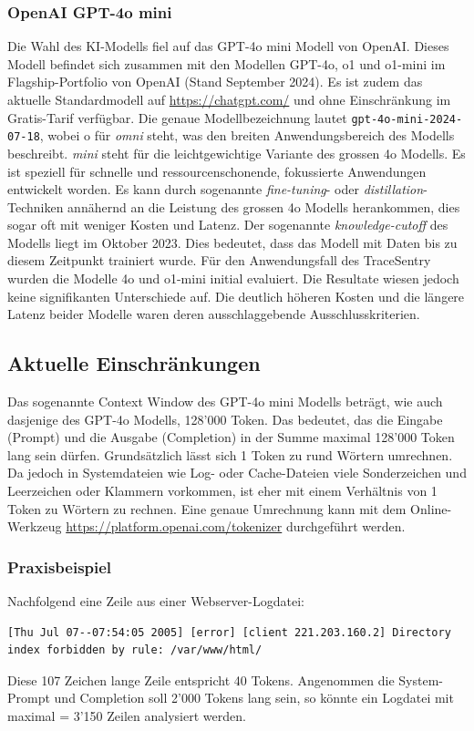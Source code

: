 \documentclass[a4paper,12pt]{report}
\begin{document}
    \subsubsection{OpenAI GPT-4o mini}\label{subsubsec:openai-gpt-4o}
    Die Wahl des KI-Modells fiel auf das GPT-4o mini Modell von OpenAI\@.
    Dieses Modell befindet sich zusammen mit den Modellen GPT-4o, o1 und o1-mini im Flagship-Portfolio von OpenAI (Stand September 2024).
    Es ist zudem das aktuelle Standardmodell auf \url{https://chatgpt.com/} und ohne Einschränkung im Gratis-Tarif verfügbar.
    Die genaue Modellbezeichnung lautet \texttt{gpt-4o-mini-2024-07-18}, wobei o für \textit{omni} steht, was den breiten Anwendungsbereich des Modells beschreibt.
    \textit{mini} steht für die leichtgewichtige Variante des grossen 4o Modells.
    Es ist speziell für schnelle und ressourcenschonende, fokussierte Anwendungen entwickelt worden.
    Es kann durch sogenannte \textit{fine-tuning}- oder \textit{distillation}-Techniken annähernd an die Leistung des grossen 4o Modells herankommen, dies sogar oft mit weniger Kosten und Latenz.
    Der sogenannte \textit{knowledge-cutoff} des Modells liegt im Oktober 2023.
    Dies bedeutet, dass das Modell mit Daten bis zu diesem Zeitpunkt trainiert wurde.
    Für den Anwendungsfall des TraceSentry wurden die Modelle 4o und o1-mini initial evaluiert.
    Die Resultate wiesen jedoch keine signifikanten Unterschiede auf.
    Die deutlich höheren Kosten und die längere Latenz beider Modelle waren deren ausschlaggebende Ausschlusskriterien.

    \subsection{Aktuelle Einschränkungen}\label{subsec:technische-einschrankungen}
    Das sogenannte Context Window des GPT-4o mini Modells beträgt, wie auch dasjenige des GPT-4o Modells, 128'000 Token.
    Das bedeutet, das die Eingabe (Prompt) und die Ausgabe (Completion) in der Summe maximal 128'000 Token lang sein dürfen.
    Grundsätzlich lässt sich 1 Token zu rund  Wörtern umrechnen.
    Da jedoch in Systemdateien wie Log- oder Cache-Dateien viele Sonderzeichen und Leerzeichen oder Klammern vorkommen, ist eher mit einem Verhältnis von 1 Token zu  Wörtern zu rechnen.
    Eine genaue Umrechnung kann mit dem Online-Werkzeug \url{https://platform.openai.com/tokenizer} durchgeführt werden.

    \subsubsection{Praxisbeispiel}\label{subsubsec:praxisbeispiel}
    Nachfolgend eine Zeile aus einer Webserver-Logdatei:
    \begin{verbatim}[Thu Jul 07--07:54:05 2005] [error] [client 221.203.160.2] Directory
index forbidden by rule: /var/www/html/
    \end{verbatim}
    Diese 107 Zeichen lange Zeile entspricht 40 Tokens.
    Angenommen die System-Prompt und Completion soll 2'000 Tokens lang sein, so könnte ein Logdatei mit maximal  = 3'150 Zeilen analysiert werden.
\end{document}
